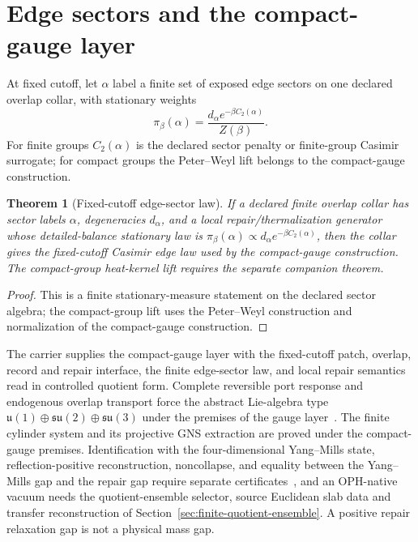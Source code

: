 \documentclass[11pt]{article}
\newtheorem{theorem}{Theorem}[section]
\theoremstyle{remark}
\theoremstyle{plain}
\begin{document}
\section{Edge sectors and the compact-gauge layer}
\label{sec:edge-sectors}

At fixed cutoff, let \(\alpha\) label a finite set of exposed edge sectors on
one declared overlap collar, with stationary weights
\[
\pi_\beta(\alpha)=\frac{d_\alpha e^{-\beta C_2(\alpha)}}{Z(\beta)}.
\]
For finite groups \(C_2(\alpha)\) is the declared sector penalty or
finite-group Casimir surrogate; for compact groups the Peter--Weyl lift
belongs to the compact-gauge construction.

\begin{theorem}[Fixed-cutoff edge-sector law]
If a declared finite overlap collar has sector labels \(\alpha\), degeneracies \(d_\alpha\), and
a local repair/thermalization generator whose detailed-balance stationary law is
\(\pi_\beta(\alpha)\propto d_\alpha e^{-\beta C_2(\alpha)}\), then the collar gives the
fixed-cutoff Casimir edge law used by the compact-gauge construction. The
compact-group heat-kernel lift requires the separate companion theorem.
\end{theorem}

\begin{proof}
This is a finite stationary-measure statement on the declared sector
algebra; the compact-group lift uses the Peter--Weyl construction and
normalization of the compact-gauge construction.
\end{proof}

The carrier supplies the compact-gauge layer with the fixed-cutoff patch,
overlap, record and repair interface, the finite edge-sector law, and local
repair semantics read in controlled quotient form. Complete reversible port
response and endogenous overlap transport force the abstract Lie-algebra type
\(\mathfrak u(1)\oplus\mathfrak{su}(2)\oplus\mathfrak{su}(3)\) under the
premises of the gauge layer~\cite{ophGauge}. The finite cylinder system and
its projective GNS extraction are proved under the compact-gauge premises.
Identification with the four-dimensional Yang--Mills state,
reflection-positive reconstruction, noncollapse, and equality between the
Yang--Mills gap and the repair gap require separate certificates~\cite{ophym},
and an OPH-native vacuum needs the quotient-ensemble selector, source
Euclidean slab data and transfer reconstruction of
Section~\ref{sec:finite-quotient-ensemble}. A positive repair relaxation gap
is not a physical mass gap.
\end{document}
